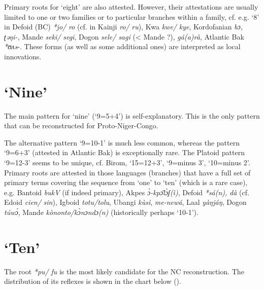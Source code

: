 Primary roots for ‘eight’ are also attested. However, their attestations are usually limited to one or two families or to particular branches within a family, cf. e.g. ‘8’ in Defoid (BC) \textit{*jo/} \textit{ro} (cf. in Kainji \textit{ro/} \textit{ru}), Kwa \textit{kwe/} \textit{kye}, Kordofanian \textit{bɔ,} \textit{ʈəŋi-}, Mande \textit{seki/} \textit{segi}, Dogon \textit{sele/} \textit{sagi} (< Mande ?), \textit{gá(a)rà}, Atlantic Bak \textit{*ʊʌs}-. These forms (as well as some additional ones) are interpreted as local innovations. 


\section{‘Nine’}%
 
The main pattern for ‘nine’ (‘9=5+4’) is self-explanatory. This is the only pattern that can be reconstructed for Proto-Niger-Congo.

The alternative pattern ‘9=10-1’ is much less common, whereas the pattern ‘9=6+3’ (attested in Atlantic Bak) is exceptionally rare. The Platoid pattern ‘9=12-3’ seems to be unique, cf. Birom, ‘15=12+3’, ‘9=minus 3’, ‘10=minus 2’. Primary roots are attested in those languages (branches) that have a full set of primary terms covering the sequence from ‘one’ to ‘ten’ (which is a rare case), e.g. Bantoid \textit{bukV} (if indeed primary), Akpes \textit{{\`{ɔ}}-kp{\={ɔ}}l{\`{ɔ}}ʃ(ì)}, Defoid \textit{*sá(n),} \textit{dà} (cf. Edoid \textit{cien/} \textit{sin}), Igboid \textit{totu/tolu}, Ubangi \textit{k{\`{u}}sì}, \textit{me-newá}, Laal \textit{yàŋjáŋ}, Dogon \textit{túw{\'{ɔ}}}, Mande \textit{kònonto/k{\`{ɔ}}nɔndɔ(n)} (historically perhaps ‘10-1’).


\section{‘Ten’}%
The root \textit{*pu/} \textit{fu} is the most likely candidate for the NC reconstruction. The distribution of its reflexes is shown in the chart below ().

